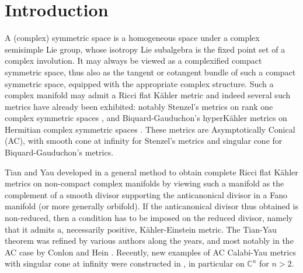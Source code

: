 \documentclass[JEP,XML,SOM,Unicode, NoEqCountersInSection, NoFloatCountersInSection]{cedram}
\theoremstyle{plain}
\theoremstyle{definition}
\begin{document}
\section{Introduction}

A (complex) symmetric space is a homogeneous space under a complex
semisimple Lie group, whose isotropy Lie subalgebra is the fixed point
set of a complex involution. It may always be viewed as a
complexified compact symmetric space, thus also as the tangent or
cotangent bundle of such a compact symmetric space, equipped with the
appropriate complex structure. Such a complex manifold may admit a
Ricci flat Kähler metric and indeed several such metrics have already
been exhibited: notably Stenzel's metrics on rank one complex
symmetric spaces \cite{Ste93}, and Biquard-Gauduchon's hyperKähler
metrics on Hermitian complex symmetric spaces \cite{BG96}. These metrics are Asymptotically Conical (AC), with smooth cone at infinity for Stenzel's metrics and singular cone for Biquard-Gauduchon's metrics.

Tian and Yau developed in \cite{TiaYau90,TiaYau91} a general method
to obtain complete Ricci flat Kähler metrics on non-compact complex
manifolds by viewing such a manifold as the complement of a smooth
divisor supporting the anticanonical divisor in a Fano manifold (or
more generally orbifold). If the anticanonical divisor thus obtained
is non-reduced, then a condition has to be imposed on the reduced
divisor, namely that it admits a, necessarily positive,
Kähler-Einstein metric. The Tian-Yau theorem was refined by various authors along the years, and most notably in the AC case by Conlon and Hein \cite{ConHei13,ConHei15}. Recently, new examples of AC Calabi-Yau metrics with singular cone at infinity were constructed in \cite{CDR16,Li17,Sze17}, in particular on $\mathbb{C}^n$ for $n>2$.
\end{document}
